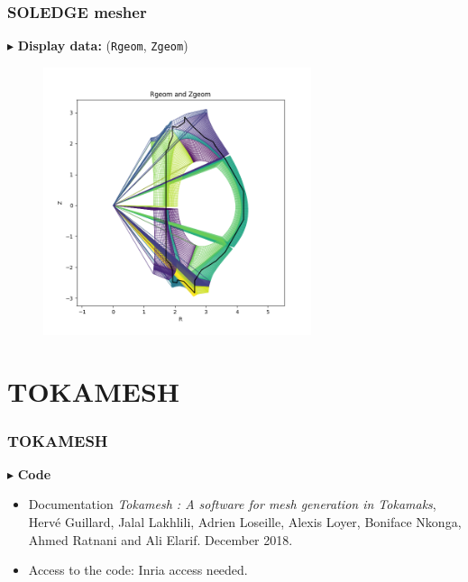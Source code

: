 \documentclass[t,10pt,a3paper]{beamer} %
\newenvironment{changemargin}[2]{%
 \begin{list}{}{%
     \setlength{\topsep}{0pt}%
     \setlength{\leftmargin}{#1}%
     \setlength{\rightmargin}{#2}%
     \setlength{\listparindent}{\parindent}%
     \setlength{\itemindent}{\parindent}%
     \setlength{\parsep}{\parskip}%
   }%
\item[]}{\end{list}}
\begin{document}
\begin{frame} %
\frametitle{\color{vert}\textbf{SOLEDGE mesher}}
\footnotesize	

{\color{vert}$\blacktriangleright$ }
\textbf{Display data:} (\verb|Rgeom|, \verb|Zgeom|)
\begin{changemargin}{-2cm}{-2cm} 
\begin{center}
\begin{figure}[!h]
	\includegraphics[width=0.7\textwidth]{images/Rgeom_and_Zgeom.png}
\end{figure}	
\end{center}
\end{changemargin}

\end{frame}



\section{TOKAMESH}

\begin{frame} %
\frametitle{\color{vert}\textbf{TOKAMESH}}
\footnotesize	

\vspace*{0.25cm}
{\color{vert}$\blacktriangleright$ }
\textbf{Code}

\begin{itemize}
	\item Documentation \textit{Tokamesh : A software for mesh generation in Tokamaks}, Hervé Guillard, Jalal Lakhlili, Adrien Loseille, Alexis Loyer, Boniface Nkonga, Ahmed Ratnani and Ali Elarif. December 2018. 
	\item Access to the code: Inria access needed. 
\end{itemize}

\end{frame}
\end{document}

